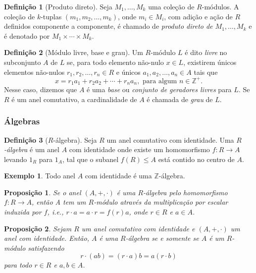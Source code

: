 \documentclass[a4paper,12pt]{report}
\theoremstyle{plain}
\newtheorem{proposicao}{Proposição}[section]
\theoremstyle{definition}
\newtheorem{definicao}{Definição}[section]
\newtheorem{exemplo}{Exemplo}[section]
\begin{document}
	\begin{definicao}[Produto direto]
		Seja $M_1,\dots,M_k$ uma coleção de $R$-módulos. A coleção de $k$-tuplas $(m_1,m_2,\dots,m_k)$, onde $m_i\in M_i$, com adição e ação de $R$ definidos componente a componente, é chamado de \emph{produto direto de $M_1,\dots,M_k$} e é denotado por $M_1\times\cdots\times M_k$.
	\end{definicao}
	
	\begin{definicao}[Módulo livre, base e grau]
		Um $R$-módulo $L$ é dito \emph{livre} no subconjunto $A$ de $L$ se, para todo elemento não-nulo $x\in L$, existirem únicos elementos não-nulos $r_1,r_2,\dots,r_n\in R$ e únicos $a_1,a_2,\dots,a_n\in A$ tais que $$x = r_1a_1 + r_2a_2 + \cdots + r_na_n, \text{ para algum $n \in \mathbb{Z}^+$}.$$ Nesse caso, dizemos que $A$ é uma \emph{base} ou \emph{conjunto de geradores livres} para $L$. Se $R$ é um anel comutativo, a cardinalidade de $A$ é chamada de \emph{grau} de $L$.
	\end{definicao}
	
	\subsubsection{Álgebras}
	
	\begin{definicao}[$R$-álgebra]
		Seja $R$ um anel comutativo com identidade. Uma \emph{$R$-álgebra} é um anel $A$ com identidade onde existe um homomorfismo $f:R\longrightarrow A$ levando $1_R$ para $1_A$, tal que o subanel $f(R) \leq A$ está contido no centro de $A$.
	\end{definicao}
	
	\begin{exemplo}
		Todo anel $A$ com identidade é uma $\mathbb{Z}$-álgebra. 
	\end{exemplo}
	
	\begin{proposicao}
		Se o anel $(A,+,\cdot)$ é uma $R$-álgebra pelo homomorfismo $f:R\longrightarrow A$, então A tem um $R$-módulo através da multiplicação por escalar induzida por $f$, i.e., $r\cdot a = a\cdot r = f(r)a$, onde $r\in R$ e $a\in A$.
	\end{proposicao}
	
	\begin{proposicao}
		Sejam $R$ um anel comutativo com identidade e $(A, +, \cdot)$ um anel com identidade. Então, $A$ é uma $R$-álgebra se e somente se $A$ é um $R$-módulo satisfazendo $$r\cdot (ab) = (r\cdot a)b = a(r\cdot b)$$ para todo $r\in R$ e $a,b \in A$.
	\end{proposicao}
	
\end{document}
